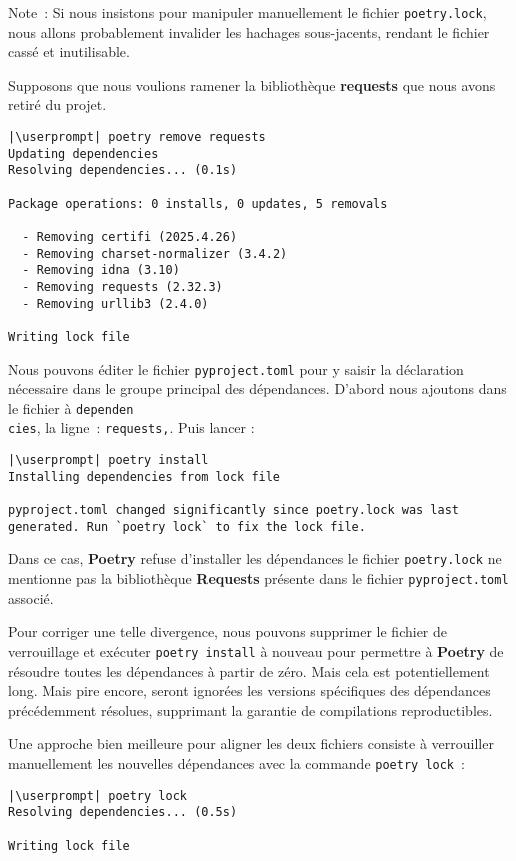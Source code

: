 Note : Si nous insistons pour manipuler manuellement le fichier \texttt{poetry.lock}, nous allons probablement invalider les hachages sous-jacents, rendant le fichier cassé et inutilisable.

Supposons que nous voulions ramener la bibliothèque \textbf{requests} que nous avons retiré du projet. 
\begin{lstlisting}[style=bash]
|\userprompt| poetry remove requests
Updating dependencies
Resolving dependencies... (0.1s)

Package operations: 0 installs, 0 updates, 5 removals

  - Removing certifi (2025.4.26)
  - Removing charset-normalizer (3.4.2)
  - Removing idna (3.10)
  - Removing requests (2.32.3)
  - Removing urllib3 (2.4.0)

Writing lock file
\end{lstlisting}

Nous pouvons éditer le fichier \texttt{pyproject.toml} pour y saisir la déclaration nécessaire dans le groupe principal des dépendances. D'abord nous ajoutons dans le fichier à \texttt{dependen\\cies}, la ligne : \texttt{\og requests\fg{},}. Puis lancer :
\begin{lstlisting}[style=bash]
|\userprompt| poetry install
Installing dependencies from lock file

pyproject.toml changed significantly since poetry.lock was last generated. Run `poetry lock` to fix the lock file.
\end{lstlisting}

Dans ce cas, \textbf{Poetry} refuse d’installer les dépendances le fichier \texttt{poetry.lock} ne mentionne pas la bibliothèque \textbf{Requests} présente dans le fichier \texttt{pyproject.toml} associé.

Pour corriger une telle divergence, nous pouvons supprimer le fichier de verrouillage et exécuter \texttt{poetry install} à nouveau pour permettre à \textbf{Poetry} de résoudre toutes les dépendances à partir de zéro. Mais cela est potentiellement long. Mais pire encore, seront ignorées les versions spécifiques des dépendances précédemment résolues, supprimant la garantie de compilations reproductibles.

Une approche bien meilleure pour aligner les deux fichiers consiste à verrouiller manuellement les nouvelles dépendances avec la commande \texttt{poetry lock} :
\begin{lstlisting}[style=bash]
|\userprompt| poetry lock
Resolving dependencies... (0.5s)

Writing lock file
\end{lstlisting}

